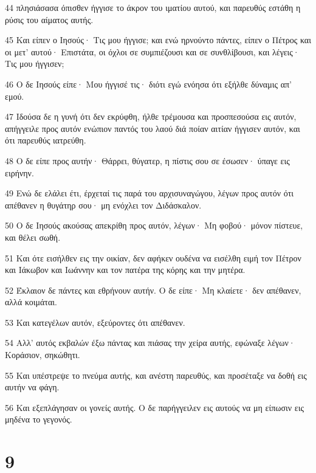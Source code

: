 \par 44 πλησιάσασα όπισθεν ήγγισε το άκρον του ιματίου αυτού, και παρευθύς εστάθη η ρύσις του αίματος αυτής.
\par 45 Και είπεν ο Ιησούς· Τις μου ήγγισε; και ενώ ηρνούντο πάντες, είπεν ο Πέτρος και οι μετ' αυτού· Επιστάτα, οι όχλοι σε συμπιέζουσι και σε συνθλίβουσι, και λέγεις· Τις μου ήγγισεν;
\par 46 Ο δε Ιησούς είπε· Μου ήγγισέ τις· διότι εγώ ενόησα ότι εξήλθε δύναμις απ' εμού.
\par 47 Ιδούσα δε η γυνή ότι δεν εκρύφθη, ήλθε τρέμουσα και προσπεσούσα εις αυτόν, απήγγειλε προς αυτόν ενώπιον παντός του λαού διά ποίαν αιτίαν ήγγισεν αυτόν, και ότι παρευθύς ιατρεύθη.
\par 48 Ο δε είπε προς αυτήν· Θάρρει, θύγατερ, η πίστις σου σε έσωσεν· ύπαγε εις ειρήνην.
\par 49 Ενώ δε ελάλει έτι, έρχεταί τις παρά του αρχισυναγώγου, λέγων προς αυτόν ότι απέθανεν η θυγάτηρ σου· μη ενόχλει τον Διδάσκαλον.
\par 50 Ο δε Ιησούς ακούσας απεκρίθη προς αυτόν, λέγων· Μη φοβού· μόνον πίστευε, και θέλει σωθή.
\par 51 Και ότε εισήλθεν εις την οικίαν, δεν αφήκεν ουδένα να εισέλθη ειμή τον Πέτρον και Ιάκωβον και Ιωάννην και τον πατέρα της κόρης και την μητέρα.
\par 52 Έκλαιον δε πάντες και εθρήνουν αυτήν. Ο δε είπε· Μη κλαίετε· δεν απέθανεν, αλλά κοιμάται.
\par 53 Και κατεγέλων αυτόν, εξεύροντες ότι απέθανεν.
\par 54 Αλλ' αυτός εκβαλών έξω πάντας και πιάσας την χείρα αυτής, εφώναξε λέγων· Κοράσιον, σηκώθητι.
\par 55 Και υπέστρεψε το πνεύμα αυτής, και ανέστη παρευθύς, και προσέταξε να δοθή εις αυτήν να φάγη.
\par 56 Και εξεπλάγησαν οι γονείς αυτής. Ο δε παρήγγειλεν εις αυτούς να μη είπωσιν εις μηδένα το γεγονός.

\chapter{9}

